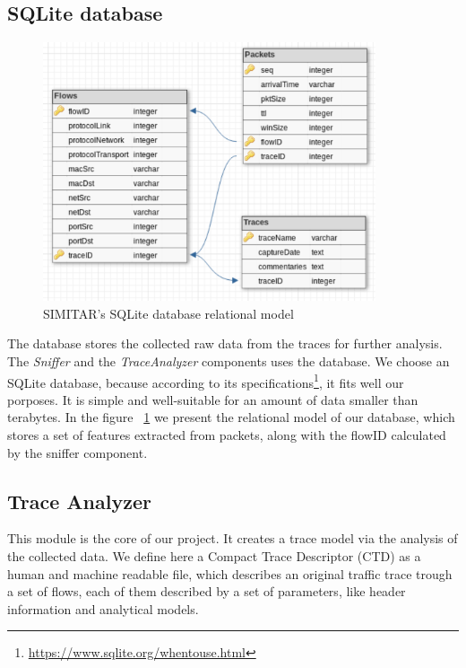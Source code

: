 \subsection{SQLite database}

\begin{figure}[ht!]
        \centering
        \includegraphics[height=3.0in]{figures/ch3/database-relational-model}
        \caption{SIMITAR's SQLite database relational model}
    \label{fig:simitar-database}
\end{figure}


The database stores the collected raw data  from the traces for further analysis. The \textit{Sniffer} and the \textit{TraceAnalyzer} components uses the database.  We choose an SQLite database, because according to its specifications\footnote{\href{https://www.sqlite.org/whentouse.html}{https://www.sqlite.org/whentouse.html}}, it fits well our porposes. It is simple and well-suitable for an amount of data smaller than terabytes. In the figure ~\ref{fig:simitar-database} we present the relational model of our database, which stores a set of features extracted from packets, along with the flowID calculated by the sniffer component. 


\subsection{Trace Analyzer}


This module is the core of our project. It creates a trace model via the analysis of the collected data. We define here a Compact Trace Descriptor (CTD) as a human and machine readable file, which describes an original traffic trace trough a set of flows, each of them described by a set of parameters, like header information and analytical models. 


